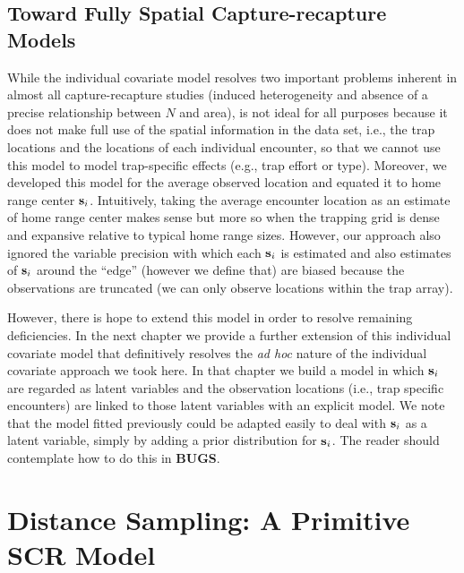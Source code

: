 \subsection{Toward Fully Spatial Capture-recapture Models}

While the individual covariate model resolves two important problems
inherent in almost all capture-recapture studies (induced
heterogeneity and absence of a precise relationship between $N$ and
area), is not ideal for all purposes because it does not make full use
of the spatial information in the data set, i.e., the trap locations
and the locations of each individual encounter, so that we cannot use
this model to model trap-specific effects (e.g., trap effort or type).
Moreover, we developed this model for the average observed location
and equated it to home range center ${\bf s}_{i}$. Intuitively, taking
the average encounter location as an estimate of home range center
makes sense but more so when the trapping grid is dense and expansive
relative to typical home range sizes.  However, our approach also
ignored the variable precision with which each ${\bf s}_{i}$ is
estimated and also estimates of ${\bf s}_{i}$
around the ``edge'' (however we define that) are biased because the
observations are truncated (we can only observe locations within the
trap array).

However, there is hope to extend this model in order to resolve
remaining deficiencies.  In the next chapter we provide a further
extension of this individual covariate model that definitively
resolves the {\it ad hoc} nature of the individual covariate approach we
took here. In that chapter we build a model in which ${\bf s}_{i}$ are
regarded as latent variables and the observation locations (i.e., trap
specific encounters) are linked to those latent variables with an
explicit model. We note that the model fitted previously could be
adapted easily to deal with ${\bf s}_{i}$ as a latent variable, simply
by adding a prior distribution for ${\bf s}_{i}$. The reader should
contemplate how to do this in {\bf BUGS}.


\section{Distance Sampling: A Primitive SCR Model}

